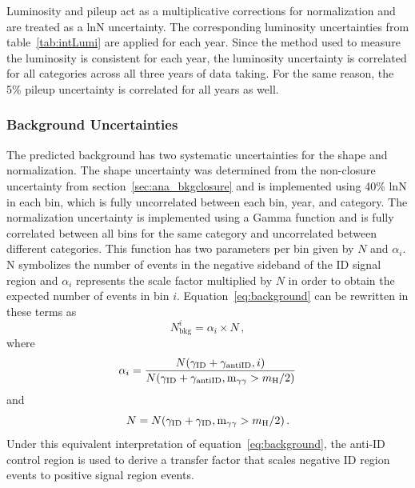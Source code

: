 Luminosity and pileup act as a multiplicative corrections for normalization and are treated as a lnN uncertainty. The corresponding luminosity uncertainties from table~\ref{tab:intLumi} are applied for each year. Since the method used to measure the luminosity is consistent for each year, the luminosity uncertainty is correlated for all categories across all three years of data taking. For the same reason, the 5\% pileup uncertainty is correlated for all years as well.

\subsubsection{Background Uncertainties} \label{sec:ana_systs_bkg}
The predicted background has two systematic uncertainties for the shape and normalization. The shape uncertainty was determined from the non-closure uncertainty from section~\ref{sec:ana_bkgclosure} and is implemented using 40\% lnN in each bin, which is fully uncorrelated between each bin, year, and category. The normalization uncertainty is implemented using a Gamma function and is fully correlated between all bins for the same category and uncorrelated between different categories. This function has two parameters per bin given by $N$ and $\alpha_i$. N symbolizes the number of events in the negative \lxy sideband of the ID signal region and $\alpha_i$ represents the scale factor multiplied by $N$ in order to obtain the expected number of events in bin $i$. Equation~\ref{eq:background} can be rewritten in these terms as
\begin{equation}
	N_\text{bkg}^i=\alpha_i\times N\,,
\end{equation}
where
\begin{equation}
	\alpha_i=\frac{N(\gamma_\mathrm{ID}+\gamma_\mathrm{antiID}, i)}{N(\gamma_\mathrm{ID}+\gamma_\mathrm{antiID}, \text{m}_{\gamma\gamma} > m_{\mathrm{H}}\space/2)}
\end{equation}
and
\begin{equation}
	N=N(\gamma_\mathrm{ID}+\gamma_\mathrm{ID}, \text{m}_{\gamma\gamma} > m_{\mathrm{H}}\space/2)\,.
\end{equation}
Under this equivalent interpretation of equation~\ref{eq:background}, the anti-ID control region is used to derive a transfer factor that scales negative \lxy ID region events to positive \lxy signal region events.

